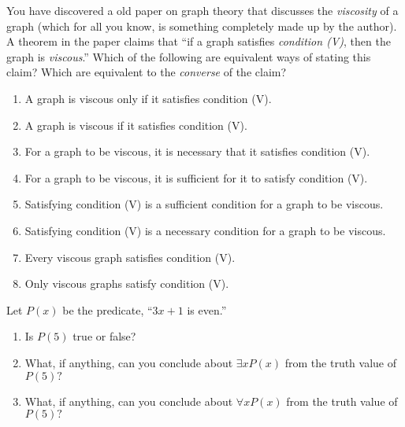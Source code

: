 \documentclass[11pt,]{book}
\theoremstyle{ptxplainnotitle}
\theoremstyle{ptxplaintitle}
\theoremstyle{ptxdefinitionnotitle}
\theoremstyle{ptxdefinitiontitle}
\theoremstyle{ptxdefinitionnotitle}
\theoremstyle{ptxdefinitiontitle}
\theoremstyle{ptxdefinitionnotitle}
\theoremstyle{ptxdefinitiontitle}
\theoremstyle{ptxdefinitiontitlenonumber}
\theoremstyle{ptxdefinitiontitlenonumber}
\numberwithin{equation}{chapter}
\begin{document}
\begin{divisionexercise}{6}\hypertarget{exercise-154}{}
\hypertarget{p-2112}{}%
You have discovered a old paper on graph theory that discusses the \emph{viscosity} of a graph (which for all you know, is something completely made up by the author).  A theorem in the paper claims that ``if a graph satisfies \emph{condition (V)}, then the graph is \emph{viscous}.''  Which of the following are equivalent ways of stating this claim?  Which are equivalent to the \emph{converse} of the claim? \leavevmode%
\begin{enumerate}[label=\alph*.]
\item\hypertarget{li-1009}{}\hypertarget{p-2113}{}%
A graph is viscous only if it satisfies condition (V). %
\item\hypertarget{li-1014}{}\hypertarget{p-2118}{}%
A graph is viscous if it satisfies condition (V). %
\item\hypertarget{li-1019}{}\hypertarget{p-2123}{}%
For a graph to be viscous, it is necessary that it satisfies condition (V). %
\item\hypertarget{li-1024}{}\hypertarget{p-2128}{}%
For a graph to be viscous, it is sufficient for it to satisfy condition (V). %
\item\hypertarget{li-1029}{}\hypertarget{p-2133}{}%
Satisfying condition (V) is a sufficient condition for a graph to be viscous. %
\item\hypertarget{li-1034}{}\hypertarget{p-2138}{}%
Satisfying condition (V) is a necessary condition for a graph to be viscous. %
\item\hypertarget{li-1039}{}\hypertarget{p-2143}{}%
Every viscous graph satisfies condition (V). %
\item\hypertarget{li-1044}{}\hypertarget{p-2148}{}%
Only viscous graphs satisfy condition (V). %
\end{enumerate}
%
\end{divisionexercise}%
\begin{divisionexercise}{7}\hypertarget{exercise-155}{}
\hypertarget{p-2167}{}%
Let \(P(x)\) be the predicate, ``\(3x+1\) is even.'' \leavevmode%
\begin{enumerate}[label=\alph*.]
\item\hypertarget{li-1060}{}\hypertarget{p-2168}{}%
Is \(P(5)\) true or false? %
\item\hypertarget{li-1065}{}\hypertarget{p-2173}{}%
What, if anything, can you conclude about \(\exists x P(x)\) from the truth value of \(P(5)\text{?}\)%
\item\hypertarget{li-1066}{}\hypertarget{p-2174}{}%
What, if anything, can you conclude about \(\forall x P(x)\) from the truth value of \(P(5)\text{?}\)%
\end{enumerate}
%
\end{divisionexercise}%
\end{document}
